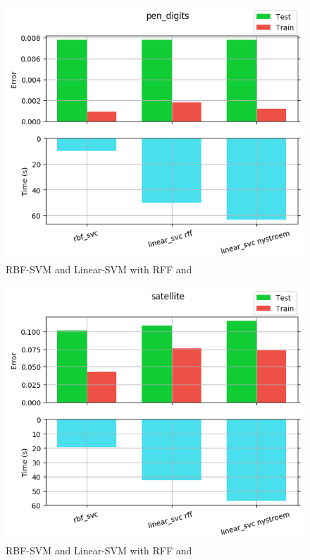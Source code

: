 \begin{figure}[th]
\centering
\includegraphics[scale=\imgscale]{Figures/1_1/pen_digits}
\decoRule
\caption[1.1 pen\tu digits]{RBF-SVM and Linear-SVM with RFF and \Nys}
\label{fig:1_1_pen_digits}
\end{figure}

\begin{figure}[th]
\centering
\includegraphics[scale=\imgscale]{Figures/1_1/satellite}
\decoRule
\caption[1.1 satellite]{RBF-SVM and Linear-SVM with RFF and \Nys}
\label{fig:1_1_satellite}
\end{figure}

